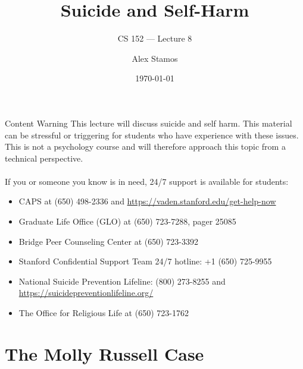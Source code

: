 \documentclass[nobackground,dvipsnames,table]{beamer}
\title{Suicide and Self-Harm}
\subtitle{CS 152 --- Lecture 8}
\author[A. Stamos]{Alex Stamos}
\institute[Stanford University]{Stanford Cyber Policy Center}
\date[2022]{\today}
\begin{document}
\begin{frame}
    \titlepage
\end{frame}

\begin{frame}{Content Warning}%
    This lecture will discuss suicide and self harm. This material can be stressful or triggering for students who have experience with these issues. This is not a psychology course and will therefore approach this topic from a technical perspective.\\~\\
    If you or someone you know is in need, 24/7 support is available for students:
    \small
    \begin{itemize}
        \item CAPS at (650) 498-2336 and \url{https://vaden.stanford.edu/get-help-now}
        \item Graduate Life Office (GLO) at (650) 723-7288, pager 25085
        \item Bridge Peer Counseling Center at (650) 723-3392
        \item Stanford Confidential Support Team 24/7 hotline: +1 (650) 725-9955
        \item National Suicide Prevention Lifeline: (800) 273-8255 and \url{https://suicidepreventionlifeline.org/}
        \item The Office for Religious Life at (650) 723-1762
    \end{itemize}
\end{frame}

\section{The Molly Russell Case}
\end{document}
